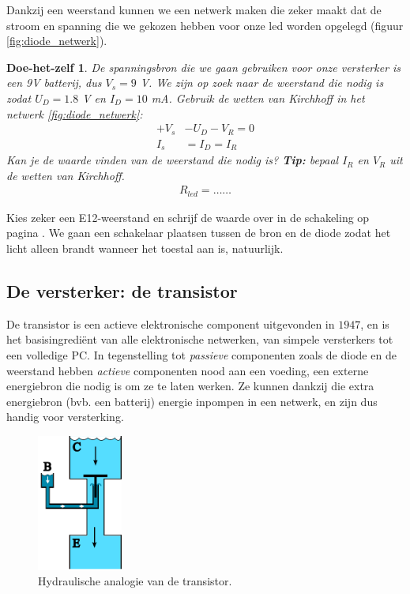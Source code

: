 \documentclass{article}
\newtheorem{DIY}{Doe-het-zelf}
\begin{document}
			Dankzij een weerstand kunnen we een netwerk maken die zeker maakt dat de stroom en spanning die we gekozen hebben voor onze led worden opgelegd (figuur \ref{fig:diode_netwerk}).
			
			\begin{DIY}
				De spanningsbron die we gaan gebruiken voor onze versterker is een 9V batterij, dus $V_s = 9$ V. We zijn op zoek naar de weerstand die nodig is zodat $U_D = 1.8$ V en $I_D =10$ mA. Gebruik de wetten van Kirchhoff in het netwerk \ref{fig:diode_netwerk}:
				\begin{align}
					+V_s &- U_D - V_R = 0  \\
					I_s &= I_D = I_R
				\end{align}
				 Kan je de waarde vinden van de weerstand die nodig is? \textbf{Tip:} bepaal $I_R$ en $V_R$ uit de wetten van Kirchhoff.
				\begin{align*}
				    R_{led} = \ldots\ldots
				\end{align*}
			\end{DIY}

			Kies zeker een E12-weerstand en schrijf de waarde over in de schakeling op pagina \pageref{fig:volledig_schema}.
			We gaan een schakelaar plaatsen tussen de bron en de diode zodat het licht alleen brandt wanneer het toestal aan is, natuurlijk.

		\subsection{De versterker: de transistor}

			De transistor is een actieve elektronische component uitgevonden in $1947$, en is het basisingredi\"ent van alle elektronische netwerken, van simpele versterkers tot een volledige PC. In tegenstelling tot \emph{passieve} componenten zoals de diode en de weerstand hebben \emph{actieve} componenten nood aan een voeding, een externe energiebron die nodig is om ze te laten werken. Ze kunnen dankzij die extra energiebron (bvb. een batterij) energie inpompen in een netwerk, en zijn dus handig voor versterking.

			\begin{figure}[htbp]
				\centering
				\includegraphics[width=0.25\textwidth]{watertransistor}
				\caption{Hydraulische analogie van de transistor.}
				\label{fig:watertransistor}
			\end{figure}
\end{document}
